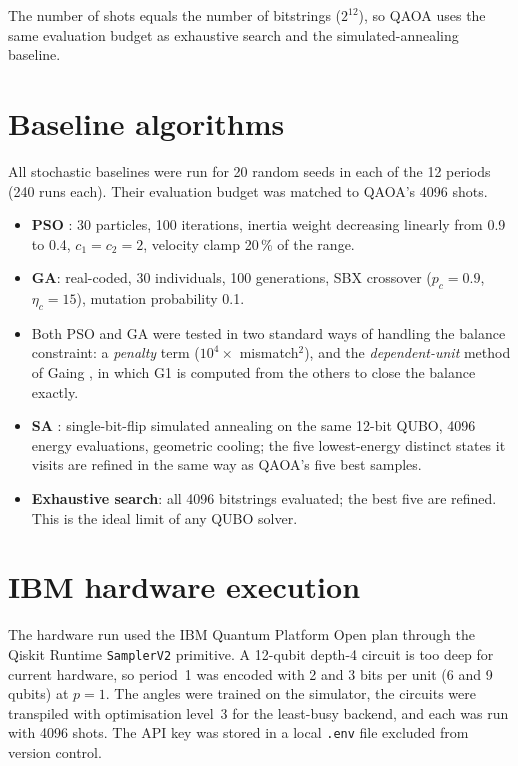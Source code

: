 The number of shots equals the number of bitstrings ($2^{12}$), so QAOA uses the same evaluation budget as exhaustive search and the simulated-annealing baseline.

\section{Baseline algorithms}
All stochastic baselines were run for 20 random seeds in each of the 12 periods (240 runs each). Their evaluation budget was matched to QAOA's 4096 shots.
\begin{itemize}
\item \textbf{PSO} \cite{shi1998}: 30 particles, 100 iterations, inertia weight decreasing linearly from 0.9 to 0.4, $c_1 = c_2 = 2$, velocity clamp 20\,\% of the range.
\item \textbf{GA}: real-coded, 30 individuals, 100 generations, SBX crossover \cite{deb1995} ($p_c = 0.9$, $\eta_c = 15$), mutation probability 0.1.
\item Both PSO and GA were tested in two standard ways of handling the balance constraint: a \emph{penalty} term ($10^4 \times$ mismatch$^2$), and the \emph{dependent-unit} method of Gaing \cite{gaing2003}, in which G1 is computed from the others to close the balance exactly.
\item \textbf{SA} \cite{kirkpatrick1983}: single-bit-flip simulated annealing on the same 12-bit QUBO, 4096 energy evaluations, geometric cooling; the five lowest-energy distinct states it visits are refined in the same way as QAOA's five best samples.
\item \textbf{Exhaustive search}: all 4096 bitstrings evaluated; the best five are refined. This is the ideal limit of any QUBO solver.
\end{itemize}

\section{IBM hardware execution}
The hardware run used the IBM Quantum Platform Open plan through the Qiskit Runtime \texttt{SamplerV2} primitive. A 12-qubit depth-4 circuit is too deep for current hardware, so period~1 was encoded with 2 and 3 bits per unit (6 and 9 qubits) at $p = 1$. The angles were trained on the simulator, the circuits were transpiled with optimisation level~3 for the least-busy backend, and each was run with 4096 shots. The API key was stored in a local \texttt{.env} file excluded from version control.

